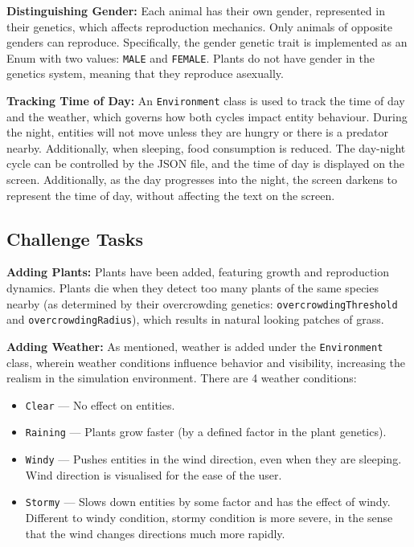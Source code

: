 \documentclass[10pt, a4paper]{scrartcl}
\begin{document}
\begin{multicols}{2}
        \noindent \textbf{Distinguishing Gender:} Each animal has their own gender, represented in their genetics,
        which affects reproduction mechanics. Only animals of opposite genders can reproduce. Specifically, the gender genetic trait
        is implemented as an Enum with two values: \verb|MALE| and \verb|FEMALE|. Plants do not have gender in the genetics system,
        meaning that they reproduce asexually.

        \noindent \textbf{Tracking Time of Day:} An \verb|Environment| class is used to track the time of day and the weather,
        which governs how both cycles impact entity behaviour. During the night, entities will not move unless they are hungry
        or there is a predator nearby. Additionally, when sleeping, food consumption is reduced. The day-night cycle can be controlled
        by the JSON file, and the time of day is displayed on the screen. Additionally, as the day progresses into the night,
        the screen darkens to represent the time of day, without affecting the text on the screen.

        \subsection{Challenge Tasks}

        \noindent \textbf{Adding Plants:} Plants have been added, featuring growth and reproduction dynamics.
        Plants die when they detect too many plants of the same species nearby (as determined by their overcrowding genetics:
        \verb|overcrowdingThreshold| and \verb|overcrowdingRadius|), which results in natural looking patches of grass.

        \noindent \textbf{Adding Weather:} As mentioned, weather is added under the \verb|Environment| class, wherein
        weather conditions influence behavior and visibility, increasing the realism in the simulation environment.
        There are 4 weather conditions:
        \begin{itemize}
            \item \verb|Clear| — No effect on entities.
            \item \verb|Raining| — Plants grow faster (by a defined factor in the plant genetics).
            \item \verb|Windy| — Pushes entities in the wind direction, even when they are sleeping.
            Wind direction is visualised for the ease of the user.
            \item \verb|Stormy| — Slows down entities by some factor and has the effect of windy. Different to
            windy condition, stormy condition is more severe, in the sense that the wind changes directions much more rapidly.
        \end{itemize}


\end{multicols}
\end{document}
